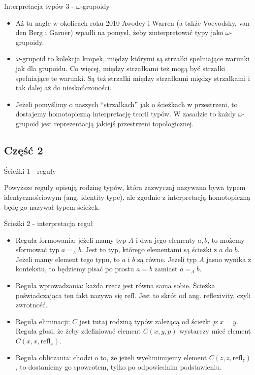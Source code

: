 \documentclass{beamer}
\newcommand{\refl}[1]{\text{refl}_{#1}}
\begin{document}
\begin{frame}{Interpretacja typów 3 - $\omega$-grupoidy}
\begin{itemize}
	\item Aż tu nagle w okolicach roku 2010 Awodey i Warren (a także Voevodsky, van den Berg i Garner) wpadli na pomysł, żeby zinterpretować typy jako $\omega$-grupoidy.
	\item $\omega$-grupoid to kolekcja kropek, między którymi są strzałki spełniające warunki jak dla grupoidu. Co więcej, między strzałkami też mogą być strzałki spełniające te warunki. Są też strzałki między strzałkami między strzałkami i tak dalej aż do nieskończoności.
	\item Jeżeli pomyślimy o naszych ``strzałkach'' jak o ścieżkach w przestrzeni, to dostajemy homotopiczną interpretację teorii typów. W zasadzie to każdy $\omega$-grupoid jest reprezentacją jakiejś przestrzeni topologicznej.
\end{itemize}
\end{frame}

\subsection{Część 2}

\begin{frame}{Ścieżki 1 - reguły}


Powyższe reguły opisują rodzinę typów, która zazwyczaj nazywana bywa typem identycznościowym (ang. identity type), ale zgodnie z interpretacją homotopiczną będę go nazywał typem ścieżek.

\end{frame}

\begin{frame}{Ścieżki 2 - interpretacja reguł}
\begin{itemize}
	\item Reguła formowania: jeżeli mamy typ $A$ i dwa jego elementy $a, b$, to możemy sformować typ $a =_A b$. Jest to typ, którego elementami są ścieżki z $a$ do $b$. Jeżeli mamy element tego typu, to $a$ i $b$ są równe. Jeżeli typ $A$ jasno wynika z kontekstu, to będziemy pisać po prostu $a = b$ zamiast $a =_A b$.
	\item Reguła wprowadzania: każda rzecz jest równa sama sobie. Ścieżka poświadczająca ten fakt nazywa się $\text{refl}$. Jest to skrót od ang. reflexivity, czyli zwrotność.
	\item Reguła eliminacji: $C$ jest tutaj rodziną typów zależącą od ścieżki $p : x = y$. Reguła głosi, że żeby zdefiniować element $C(x, y, p)$ wystarczy mieć element $C(x, x, \refl{x})$.
	\item Reguła obliczania: chodzi o to, że jeżeli wyeliminujemy element $C(z, z, \refl{z})$, to dostaniemy go spowrotem, tylko po odpowiednim podstawieniu.
\end{itemize}
\end{frame}
\end{document}
